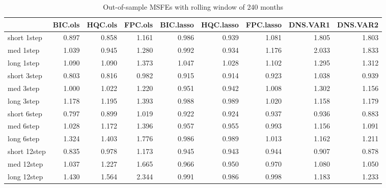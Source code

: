 \begin{table}[htbp]
\centering
\begin{table}

\caption{\label{tab:tbl:table4-240}Out-of-sample MSFEs with rolling window of 240 months}
\centering
\begin{tabular}[t]{lrrrrrrrr}
\toprule
  & BIC.ols & HQC.ols & FPC.ols & BIC.lasso & HQC.lasso & FPC.lasso & DNS.VAR1 & DNS.VAR2\\
\midrule
short 1step & 0.897 & 0.858 & 1.161 & 0.986 & 0.939 & 1.081 & 1.805 & 1.803\\
med 1step & 1.039 & 0.945 & 1.280 & 0.992 & 0.934 & 1.176 & 2.033 & 1.833\\
long 1step & 1.090 & 1.090 & 1.373 & 1.047 & 1.028 & 1.102 & 1.295 & 1.312\\
short 3step & 0.803 & 0.816 & 0.982 & 0.915 & 0.914 & 0.923 & 1.038 & 0.939\\
med 3step & 1.000 & 1.022 & 1.220 & 0.951 & 0.942 & 1.008 & 1.302 & 1.156\\
\addlinespace
long 3step & 1.178 & 1.195 & 1.393 & 0.988 & 0.989 & 1.020 & 1.158 & 1.179\\
short 6step & 0.797 & 0.899 & 1.019 & 0.922 & 0.924 & 0.937 & 0.936 & 0.883\\
med 6step & 1.028 & 1.172 & 1.396 & 0.957 & 0.955 & 0.993 & 1.156 & 1.091\\
long 6step & 1.324 & 1.403 & 1.776 & 0.986 & 0.989 & 1.013 & 1.162 & 1.211\\
short 12step & 0.835 & 0.978 & 1.173 & 0.945 & 0.943 & 0.944 & 0.907 & 0.878\\
\addlinespace
med 12step & 1.037 & 1.227 & 1.665 & 0.966 & 0.950 & 0.970 & 1.080 & 1.050\\
long 12step & 1.430 & 1.564 & 2.344 & 0.991 & 0.986 & 0.998 & 1.183 & 1.233\\
\bottomrule
\end{tabular}
\end{table}
\label{tbl:table4-240}
\end{table}
